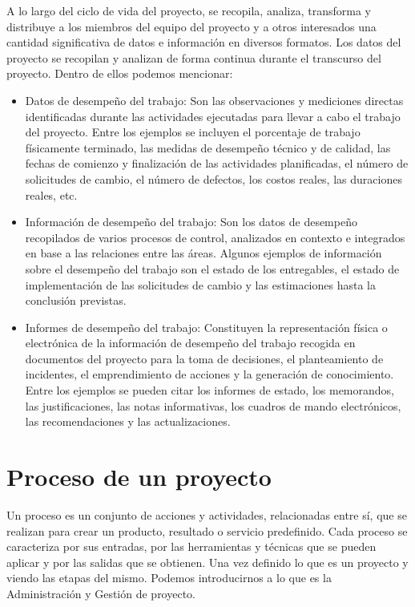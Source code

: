 A lo largo del ciclo de vida del proyecto, se recopila, analiza, transforma y distribuye a los miembros del equipo del proyecto y a otros interesados una cantidad significativa de datos e información en diversos formatos. Los datos del proyecto se recopilan y analizan de forma continua durante el transcurso del proyecto. 
\newline
Dentro de ellos podemos mencionar:
\begin{itemize}
\item Datos de desempeño del trabajo: Son las observaciones y mediciones directas identificadas durante las actividades ejecutadas para llevar a cabo el trabajo del proyecto. Entre los ejemplos se incluyen el porcentaje de trabajo físicamente terminado, las medidas de desempeño técnico y de calidad, las fechas de comienzo y finalización de las actividades planificadas, el número de solicitudes de cambio, el número de defectos, los costos reales, las duraciones reales, etc. 
\item Información de desempeño del trabajo: Son los datos de desempeño recopilados de varios procesos de control, analizados en contexto e integrados en base a las relaciones entre las áreas. Algunos ejemplos de información sobre el desempeño del trabajo son el estado de los entregables, el estado de implementación de las solicitudes de cambio y las estimaciones hasta la conclusión previstas.
\item Informes de desempeño del trabajo: Constituyen la representación física o electrónica de la información de desempeño del trabajo recogida en documentos del proyecto para la toma de decisiones, el planteamiento de incidentes, el emprendimiento de acciones y la generación de conocimiento. Entre los ejemplos se pueden citar los informes de estado, los memorandos, las justificaciones, las notas informativas, los cuadros de mando electrónicos, las recomendaciones y las actualizaciones.\cite{R. Lopez.}\cite{PMBOK}
\end{itemize}

\section{Proceso de un proyecto}	
Un proceso es un conjunto de acciones y actividades, relacionadas entre sí, que se realizan para crear un producto, resultado o servicio predefinido. Cada proceso se caracteriza por sus entradas, por las herramientas y técnicas que se pueden aplicar y por las salidas que se obtienen.\cite{PMBOK}
\newline
Una vez definido lo que es un proyecto y viendo las etapas del mismo. Podemos introducirnos a lo que es la Administración y Gestión de proyecto. 
